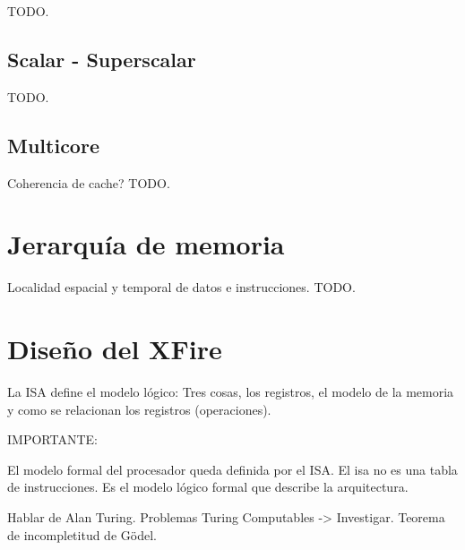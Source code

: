 TODO.

\subsection{Scalar - Superscalar}
\label{subsec:optimizations-scalar_superscalar}

TODO.

\subsection{Multicore}
\label{subsec:optimizations-multicore}

Coherencia de cache?
TODO.

\section{Jerarquía de memoria}
\label{sec:mem_hierarchy}

Localidad espacial y temporal de datos e instrucciones. TODO.

\section{Diseño del XFire}

La ISA define el modelo lógico: Tres cosas, los registros, el modelo de la
memoria y como se relacionan los registros (operaciones).



IMPORTANTE:

El modelo formal del procesador queda definida por el ISA. El isa no es una tabla de instrucciones. Es el modelo lógico formal que describe la arquitectura.

Hablar de Alan Turing. Problemas Turing Computables -> Investigar. Teorema de incompletitud de Gödel.
